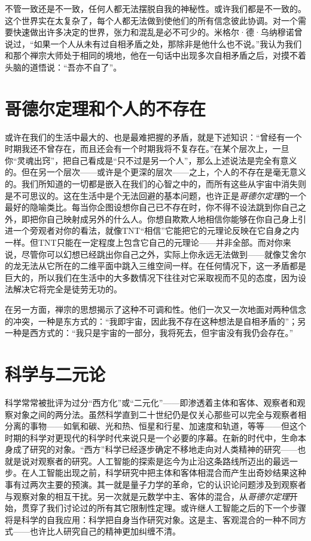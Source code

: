 不管一致还是不一致，任何人都无法摆脱自我的神秘性。或许我们都是不一致的。这个世界实在太复杂了，每个人都无法做到使他们的所有信念彼此协调。对一个需要快速做出许多决定的世界，张力和混乱是必不可少的。米格尔·德·乌纳穆诺曾说过，“如果一个人从未有过自相矛盾之处，那除非是他什么也不说。”我认为我们和那个禅宗大师处于相同的境地，他在一句话中出现多次自相矛盾之后，对摸不着头脑的道悟说：“吾亦不自了”。

\section{哥德尔定理和个人的不存在}

或许在我们的生活中最大的、也是最难把握的矛盾，就是下述知识：“曾经有一个时期我还不曾存在，而且还会有一个时期我将不复存在。”在某个层次上，一旦你“灵魂出窍”，把自己看成是“只不过是另一个人”，那么上述说法是完全有意义的。但在另一个层次——或许是个更深的层次——之上，个人的不存在是毫无意义的。我们所知道的一切都是嵌入在我们的心智之中的，而所有这些从宇宙中消失则是不可思议的。这在生活中是个无法回避的基本问题，也许正是\emph{哥德尔定理}的一个最好的隐喻类比。每当你企图设想你自己已不存在时，你不得不设法跳到你自己之外，即把你自己映射成另外的什么人。你想自欺欺人地相信你能够在你自己身上引进一个旁观者对你的看法，就像TNT“相信”它能把它的元理论反映在它自身之内一样。但TNT只能在一定程度上包含它自己的元理论——并非全部。而对你来说，尽管你可以幻想已经跳出你自己之外，实际上你永远无法做到——就像艾舍尔的龙无法从它所在的二维平面中跳入三维空间一样。在任何情况下，这一矛盾都是巨大的，所以我们在生活中的大多数情况下往往对它采取视而不见的态度，因为设法解决它将完全是徒劳无功的。

在另一方面，禅宗的思想揭示了这种不可调和性。他们一次又一次地面对两种信念的冲突，一种是东方式的：“我即宇宙，因此我不存在这种想法是自相矛盾的”；另一种是西方式的：“我只是宇宙的一部分，我将死去，但宇宙没有我仍会存在。”

\section{科学与二元论}

科学常常被批评为过分“西方化”或“二元化”——即渗透着主体和客体、观察者和观察对象之间的两分法。虽然科学直到二十世纪仍是仅关心那些可以完全与观察者相分离的事物——如氧和碳、光和热、恒星和行星、加速度和轨道，等等——但这个时期的科学对更现代的科学时代来说只是一个必要的序幕。在新的时代中，生命本身成了研究的对象。“西方”科学已经逐步确定不移地走向对人类精神的研究——也就是说对观察者的研究。人工智能的探索是迄今为止沿这条路线所迈出的最远一步。在人工智能出现之前，科学研究中把主体和客体相混合而产生出奇妙结果这种事有过两次主要的预演。其一就是量子力学的革命，它的认识论问题涉及到观察者与观察对象的相互干扰。另一次就是元数学中主、客体的混合，从\emph{哥德尔定理}开始，贯穿了我们讨论过的所有其它限制性定理。或许继人工智能之后的下一个步骤将是科学的自我应用：科学把自身当作研究对象。这是主、客观混合的一种不同方式——也许比人研究自己的精神更加纠缠不清。

